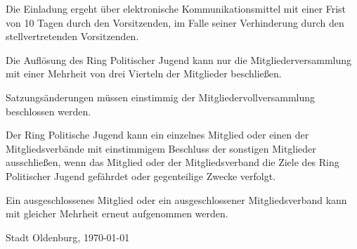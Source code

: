\documentclass[10pt,a4paper,oneside,parskip=half]{scrartcl}
\begin{document}
\begin{contract}
Die Einladung ergeht über elektronische Kommunikationsmittel mit einer Frist von 10 Tagen durch den Vorsitzenden, im Falle seiner Verhinderung durch den stellvertretenden Vorsitzenden.

Die Auflösung des Ring Politischer Jugend kann nur die Mitgliederversammlung mit einer Mehrheit von drei Vierteln der Mitglieder beschließen.

Satzungsänderungen müssen einstimmig der Mitgliedervollversammlung beschlossen werden.

Der Ring Politische Jugend kann ein einzelnes Mitglied oder einen der Mitgliedsverbände mit einstimmigem Beschluss der sonstigen Mitglieder ausschließen, wenn das Mitglied oder der Mitgliedsverband die Ziele des Ring Politischer Jugend gefährdet oder gegenteilige Zwecke verfolgt.

Ein ausgeschlossenes Mitglied oder ein ausgeschlossener Mitgliedsverband kann mit gleicher Mehrheit erneut aufgenommen werden.

\end{contract}
\vspace{1cm}
Stadt Oldenburg, \today
\end{document}
